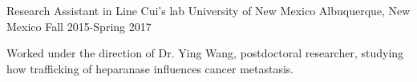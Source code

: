 \begin{cventries}
  \cventry
    {Research Assistant in Line Cui's lab} %
    {University of New Mexico} %
    {Albuquerque, New Mexico} %
    {Fall 2015-Spring 2017} %
    {
      \begin{cvitems}
        \item{Worked under the direction of Dr. Ying Wang, postdoctoral researcher, studying how trafficking of heparanase influences cancer metastasis.}
      \end{cvitems}
    }

\end{cventries}
